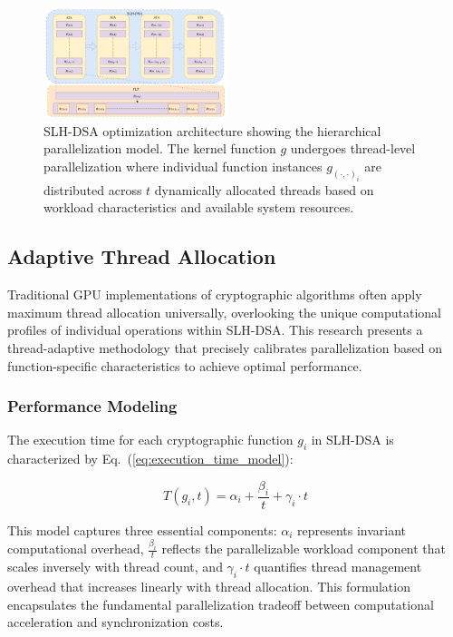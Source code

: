 \documentclass[journal]{IEEEtran}
\begin{document}
\begin{figure}[htbp]
  \centering
  \includegraphics[width=0.48\textwidth]{./fig/optimize-overview.drawio.pdf}
  \caption{SLH-DSA optimization architecture showing the hierarchical parallelization model. The kernel function $g$ undergoes thread-level parallelization where individual function instances $g_{(\cdot,\cdot)_i}$ are distributed across $t$ dynamically allocated threads based on workload characteristics and available system resources.}
  \label{fig:optimization_architecture}
\end{figure}

\subsection{Adaptive Thread Allocation}

Traditional GPU implementations of cryptographic algorithms often apply maximum thread allocation universally, overlooking the unique computational profiles of individual operations within SLH-DSA. This research presents a thread-adaptive methodology that precisely calibrates parallelization based on function-specific characteristics to achieve optimal performance.

\subsubsection{Performance Modeling}

The execution time for each cryptographic function $g_i$ in SLH-DSA is characterized by Eq.~(\ref{eq:execution_time_model}):

\begin{equation}
  \label{eq:execution_time_model}
  T(g_i, t) = \alpha_i + \frac{\beta_i}{t} + \gamma_i \cdot t
\end{equation}

This model captures three essential components: $\alpha_i$ represents invariant computational overhead, $\frac{\beta_i}{t}$ reflects the parallelizable workload component that scales inversely with thread count, and $\gamma_i \cdot t$ quantifies thread management overhead that increases linearly with thread allocation. This formulation encapsulates the fundamental parallelization tradeoff between computational acceleration and synchronization costs.
\end{document}
